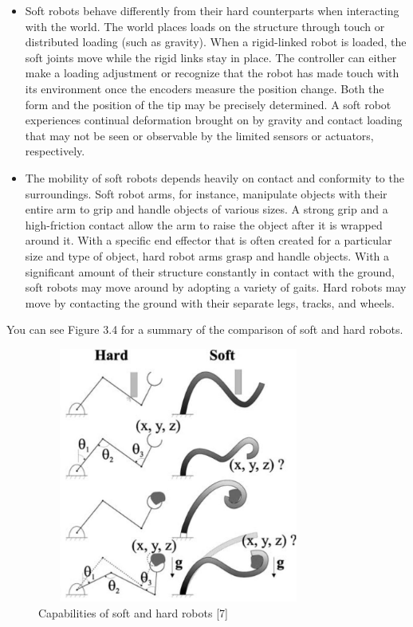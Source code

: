\documentclass[12pt,twoside,a4]{mwbk}
\begin{document}
\begin{itemize}
    \item Soft robots behave differently from their hard counterparts when interacting with the world. The world places loads on the structure through touch or distributed loading (such as gravity). When a rigid-linked robot is loaded, the soft joints move while the rigid links stay in place. The controller can either make a loading adjustment or recognize that the robot has made touch with its environment once the encoders measure the position change. Both the form and the position of the tip may be precisely determined. A soft robot experiences continual deformation brought on by gravity and contact loading that may not be seen or observable by the limited sensors or actuators, respectively.
    \newpage
    \item The mobility of soft robots depends heavily on contact and conformity to the surroundings. Soft robot arms, for instance, manipulate objects with their entire arm to grip and handle objects of various sizes. A strong grip and a high-friction contact allow the arm to raise the object after it is wrapped around it. With a specific end effector that is often created for a particular size and type of object, hard robot arms grasp and handle objects. With a significant amount of their structure constantly in contact with the ground, soft robots may move around by adopting a variety of gaits. Hard robots may move by contacting the ground with their separate legs, tracks, and wheels.
\end{itemize}
You can see Figure 3.4 for a summary of the comparison of soft and hard robots.
\begin{figure}[h]
    \centering
    \includegraphics[width=9.3cm, height=8.4cm]{hardvssoft.JPG}
    \caption{Capabilities of soft and hard robots [7]}
\end{figure}
\end{document}
